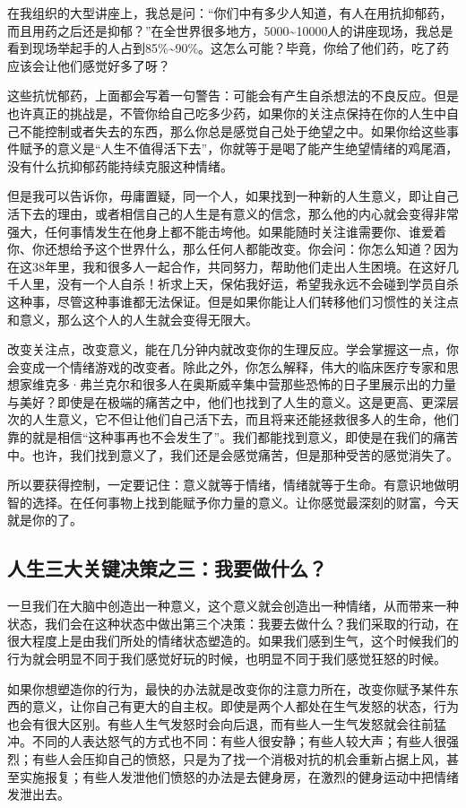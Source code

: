 在我组织的大型讲座上，我总是问：“你们中有多少人知道，有人在用抗抑郁药，而且用药之后还是抑郁？”在全世界很多地方，5000\textasciitilde{}10000人的讲座现场，我总是看到现场举起手的人占到85\%\textasciitilde{}90\%。这怎么可能？毕竟，你给了他们药，吃了药应该会让他们感觉好多了呀？

这些抗忧郁药，上面都会写着一句警告：可能会有产生自杀想法的不良反应。但是也许真正的挑战是，不管你给自己吃多少药，如果你的关注点保持在你的人生中自己不能控制或者失去的东西，那么你总是感觉自己处于绝望之中。如果你给这些事件赋予的意义是“人生不值得活下去”，你就等于是喝了能产生绝望情绪的鸡尾酒，没有什么抗抑郁药能持续克服这种情绪。

但是我可以告诉你，毋庸置疑，同一个人，如果找到一种新的人生意义，即让自己活下去的理由，或者相信自己的人生是有意义的信念，那么他的内心就会变得非常强大，任何事情发生在他身上都不能击垮他。如果能随时关注谁需要你、谁爱着你、你还想给予这个世界什么，那么任何人都能改变。你会问：你怎么知道？因为在这38年里，我和很多人一起合作，共同努力，帮助他们走出人生困境。在这好几千人里，没有一个人自杀！祈求上天，保佑我好运，希望我永远不会碰到学员自杀这种事，尽管这种事谁都无法保证。但是如果你能让人们转移他们习惯性的关注点和意义，那么这个人的人生就会变得无限大。

改变关注点，改变意义，能在几分钟内就改变你的生理反应。学会掌握这一点，你会变成一个情绪游戏的改变者。除此之外，你怎么解释，伟大的临床医疗专家和思想家维克多·弗兰克尔和很多人在奥斯威辛集中营那些恐怖的日子里展示出的力量与美好？即使是在极端的痛苦之中，他们也找到了人生的意义。这是更高、更深层次的人生意义，它不但让他们自己活下去，而且将来还能拯救很多人的生命，他们靠的就是相信“这种事再也不会发生了”。我们都能找到意义，即使是在我们的痛苦中。也许，我们找到意义了，我们还是会感觉痛苦，但是那种受苦的感觉消失了。

所以要获得控制，一定要记住：意义就等于情绪，情绪就等于生命。有意识地做明智的选择。在任何事物上找到能赋予你力量的意义。让你感觉最深刻的财富，今天就是你的了。

\subsection{人生三大关键决策之三：我要做什么？}

一旦我们在大脑中创造出一种意义，这个意义就会创造出一种情绪，从而带来一种状态，我们会在这种状态中做出第三个决策：我要去做什么？我们采取的行动，在很大程度上是由我们所处的情绪状态塑造的。如果我们感到生气，这个时候我们的行为就会明显不同于我们感觉好玩的时候，也明显不同于我们感觉狂怒的时候。

如果你想塑造你的行为，最快的办法就是改变你的注意力所在，改变你赋予某件东西的意义，让你自己有更大的自主权。即使是两个人都处在生气发怒的状态，行为也会有很大区别。有些人生气发怒时会向后退，而有些人一生气发怒就会往前猛冲。不同的人表达怒气的方式也不同：有些人很安静；有些人较大声；有些人很强烈；有些人会压抑自己的愤怒，只是为了找一个消极对抗的机会重新占据上风，甚至实施报复；有些人发泄他们愤怒的办法是去健身房，在激烈的健身运动中把情绪发泄出去。

